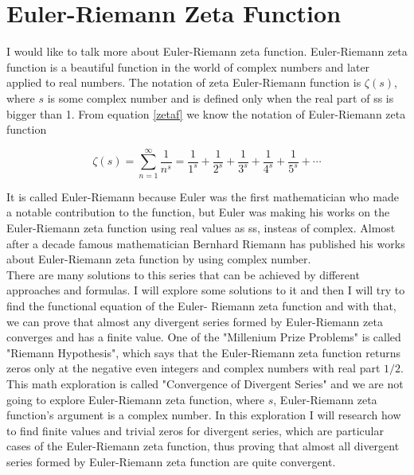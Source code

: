 \documentclass[a4paper]{article}
\begin{document}
\section{Euler-Riemann Zeta Function}
\label{sec:org9a739fc}

I would like to talk more about Euler-Riemann zeta function. Euler-Riemann zeta
function is a beautiful function in the world of complex numbers and later
applied to real numbers. The notation of zeta Euler-Riemann function is
\(\zeta(s)\), where \(s\) is some complex number and is defined only when the real
part of ss is bigger than 1. From equation \ref{zetaf} we know the notation of
Euler-Riemann zeta function 

\begin{equation*}
  \zeta(s)=\sum_{n=1}^{\infty} \frac{1}{n^s}=\frac{1}{1^s}+\frac{1}{2^s}+\frac{1}{3^s}+
  \frac{1}{4^s}+\frac{1}{5^s}+\cdots
  \end{equation*}

It is called Euler-Riemann because Euler was the first mathematician who made a
notable contribution to the function, but Euler was making his works on the
Euler-Riemann zeta function using real values as ss, insteas of complex. Almost
after a decade famous mathematician Bernhard Riemann has published his works
about Euler-Riemann zeta function by using complex number.\\

There are many solutions to this series that can be achieved by different
approaches and formulas. I will explore some solutions to it and then I will try
to find the functional equation of the Euler- Riemann zeta function and with
that, we can prove that almost any divergent series formed by Euler-Riemann zeta
converges and has a finite value. One of the "Millenium Prize Problems" is
called "Riemann Hypothesis", which says that the Euler-Riemann zeta function
returns zeros only at the negative even integers and complex numbers with real
part \(1/2\).\\

This math exploration is called "Convergence of Divergent Series" and we are not
going to explore Euler-Riemann zeta function, where \(s\), Euler-Riemann zeta
function's argument is a complex number. In this exploration I will research how
to find finite values and trivial zeros for divergent series, which are
particular cases of the Euler-Riemann zeta function, thus proving that almost
all divergent series formed by Euler-Riemann zeta function are quite
convergent.\\
\end{document}

